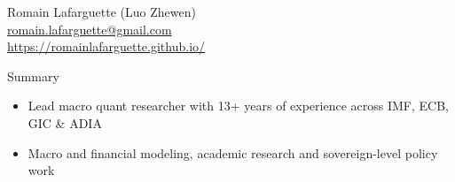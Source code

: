\documentclass[usegeometry, 10pt, a4paper]{cv} %
\begin{document}
\hspace{10mm}
\begin{chapeau}
\begin{adresse}
\begin{flushleft}
    Romain Lafarguette (Luo Zhewen)\\
    \href{mailto:romain.lafarguette@gmail.com}{romain.lafarguette@gmail.com}\\
    \url{https://romainlafarguette.github.io/} \\
\end{flushleft}
\end{adresse}
\end{chapeau}

\vspace{-0.5cm}

\begin{rubriquetableau}[0.95\textwidth]{Summary}\\
  \vspace{-1cm}
  \begin{itemize}
  \item Lead macro quant researcher with 13+ years of experience across IMF, ECB, GIC \& ADIA
  \item Macro and financial modeling, academic research and sovereign-level policy work 
  \end{itemize}

\end{rubriquetableau}

\vspace{0.2cm}

\end{document}
